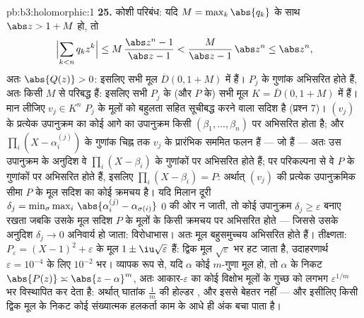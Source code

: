 \begin{solution}{pb:b3:holomorphic:1}
\textbf{25.} कोशी परिबंध: यदि $M =
\max_k\abs{q_k}$ के साथ $\abs z > 1 + M$ हो, तो
\[
\Bigl|\sum_{k<n}q_kz^k\Bigr|
\leq M\,\frac{\abs z^n - 1}{\abs z - 1}
< \frac{M}{\abs z - 1}\,\abs z^n \leq \abs z^n,
\]
अतः $\abs{Q(z)} > 0$: इसलिए सभी मूल $\overline D(0, 1+M)$ में हैं। $P_j$ के गुणांक अभिसरित होते
हैं, अतः किसी $M$ से परिबद्ध हैं: इसलिए सभी $P_j$ के (और $P$ के)
सभी मूल  $K = \overline D(0, 1 + M)$ में हैं। मान लीजिए $v_j \in K^n$ $P_j$ के मूलों को बहुलता
सहित सूचीबद्ध करने वाला सदिश है (प्रश्न 7)। $(v_j)$ के प्रत्येक उपानुक्रम
का कोई आगे का उपानुक्रम किसी $(\beta_1, \dots, \beta_n)$ पर अभिसरित होता है; और $\prod_i(X - \alpha_i^{(j)})$ के
गुणांक चिह्न तक $v_j$ के प्रारंभिक सममित फलन हैं --- जो  हैं
--- अतः उस उपानुक्रम के अनुदिश वे $\prod_i(X - \beta_i)$ के गुणांकों पर अभिसरित होते
हैं; पर परिकल्पना से वे $P$ के गुणांकों पर अभिसरित होते हैं, इसलिए
$\prod_i(X -
\beta_i) = P$: अर्थात् $(v_j)$ की प्रत्येक उपानुक्रमिक सीमा $P$ के मूल सदिश
का कोई क्रमचय है। यदि मिलान दूरी $\delta_j = \min_\sigma\max_i\,
\abs{\alpha_i^{(j)} - \alpha_{\sigma(i)}}$ $0$ की ओर न जाती, तो कोई
उपानुक्रम $\delta_j \geq \varepsilon$ बनाए रखता जबकि उसके मूल सदिश $P$ के मूलों के किसी
क्रमचय पर अभिसरित होते --- जिससे उसके अनुदिश $\delta_j \to 0$ अनिवार्य हो जाता:
विरोधाभास। अतः मूल बहुसमुच्चय अभिसरित होते हैं। तीक्ष्णता: $P_\varepsilon = (X - 1)^2 + \varepsilon$ के
मूल $1 \pm
\iu\sqrt\varepsilon$ हैं: द्विक मूल $\sqrt\varepsilon$ भर हट जाता है, उदाहरणार्थ $\varepsilon =
10^{-4}$ के
लिए $10^{-2}$ भर। व्यापक रूप से, यदि $\alpha$ कोई $m$-गुणा मूल हो, तो
$\alpha$ के निकट $\abs{P(z)} \asymp \abs{z -
\alpha}^m$, अतः आकार-$\varepsilon$ का कोई विक्षोभ मूलों के गुच्छ को
लगभग $\varepsilon^{1/m}$ भर विस्थापित कर देता है: अर्थात् घातांक $\frac1m$ की होल्डर
, और इससे बेहतर नहीं --- और इसीलिए किसी द्विक मूल के निकट कोई
संख्यात्मक हलकर्ता काम के आधे ही अंक बचा पाता है।
\end{solution}
